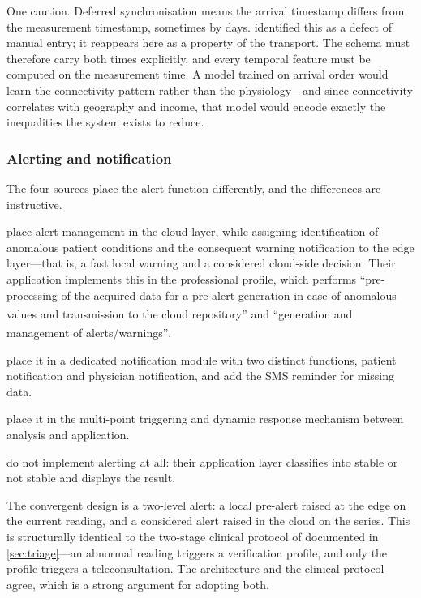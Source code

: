 \documentclass[12pt,a4paper,oneside]{report}
\newcommand{\bq}[1]{``#1''\textsuperscript{\dag}}
\begin{document}
One caution. Deferred synchronisation means the arrival timestamp differs from the measurement timestamp, sometimes by days.  identified this as a defect of manual entry; it reappears here as a property of the transport. The schema must therefore carry both times explicitly, and every temporal feature must be computed on the measurement time. A model trained on arrival order would learn the connectivity pattern rather than the physiology---and since connectivity correlates with geography and income, that model would encode exactly the inequalities the system exists to reduce.

\subsubsection{Alerting and notification}\label{sec:alerting}

The four sources place the alert function differently, and the differences are instructive.

\Textcite{mucchi2021} place alert management in the cloud layer, while assigning identification of anomalous patient conditions and the consequent warning notification to the edge layer---that is, a fast local warning and a considered cloud-side decision. Their application implements this in the professional profile, which performs \bq{pre-processing of the acquired data for a pre-alert generation in case of anomalous values and transmission to the cloud repository} and \bq{generation and management of alerts/warnings}.

\Textcite{yazdani2018} place it in a dedicated notification module with two distinct functions, patient notification and physician notification, and add the SMS reminder for missing data.

\Textcite{liu2025review} place it in the multi-point triggering and dynamic response mechanism between analysis and application.

\Textcite{efendi2025} do not implement alerting at all: their application layer classifies into stable or not stable and displays the result.

The convergent design is a two-level alert: a local pre-alert raised at the edge on the current reading, and a considered alert raised in the cloud on the series. This is structurally identical to the two-stage clinical protocol of \textcite{mihevc2025} documented in \cref{sec:triage}---an abnormal reading triggers a verification profile, and only the profile triggers a teleconsultation. The architecture and the clinical protocol agree, which is a strong argument for adopting both.
\end{document}
